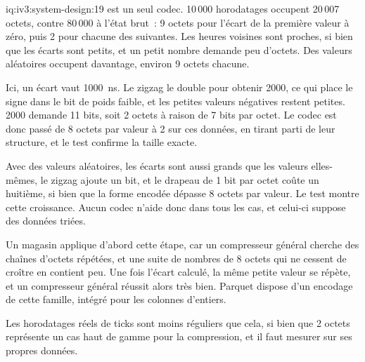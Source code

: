\begin{solution}{iq:iv3:system-design:19}
 est un seul codec. 10\,000 horodatages occupent 20\,007 octets, contre 80\,000 à l'état brut~: 9 octets pour l'écart de la première valeur à zéro, puis 2 pour chacune des suivantes. Les heures voisines sont proches, si bien que les écarts sont petits, et un petit nombre demande peu d'octets. Des valeurs aléatoires occupent davantage, environ 9 octets chacune.
\label{lst:iv3:sd:delta}

Ici, un écart vaut 1000~ns. Le zigzag le double pour obtenir 2000, ce qui place le signe dans le bit de poids faible, et les petites valeurs négatives restent petites. 2000 demande 11 bits, soit 2 octets à raison de 7 bits par octet. Le codec est donc passé de 8 octets par valeur à 2 sur ces données, en tirant parti de leur structure, et le test confirme la taille exacte.

Avec des valeurs aléatoires, les écarts sont aussi grands que les valeurs elles-mêmes, le zigzag ajoute un bit, et le drapeau de 1 bit par octet coûte un huitième, si bien que la forme encodée dépasse 8 octets par valeur. Le test montre cette croissance. Aucun codec n'aide donc dans tous les cas, et celui-ci suppose des données triées.

Un magasin applique d'abord cette étape, car un compresseur général cherche des chaînes d'octets répétées, et une suite de nombres de 8 octets qui ne cessent de croître en contient peu. Une fois l'écart calculé, la même petite valeur se répète, et un compresseur général réussit alors très bien. Parquet dispose d'un encodage de cette famille, intégré pour les colonnes d'entiers.

Les horodatages réels de ticks sont moins réguliers que cela, si bien que 2 octets représente un cas haut de gamme pour la compression, et il faut mesurer sur ses propres données.

\end{solution}

